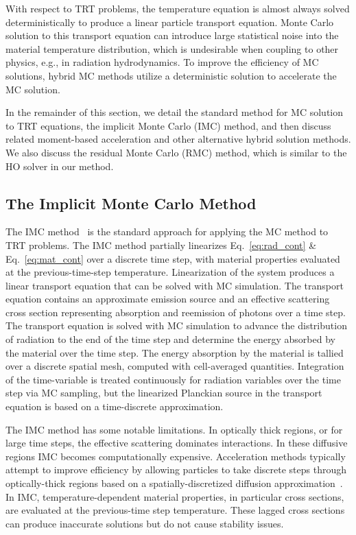 With respect to TRT problems, the temperature equation is almost always solved
deterministically to produce a linear particle transport equation. Monte Carlo solution to
this transport equation can introduce large statistical
noise into the material temperature distribution, which is undesirable when coupling to
other physics, e.g., in radiation hydrodynamics.  To improve the efficiency of MC solutions, hybrid MC methods utilize a
deterministic solution to accelerate the MC solution.  

In the remainder of this section, we detail the standard method for MC solution to TRT
equations, the implicit Monte Carlo (IMC) method, and then discuss related moment-based acceleration and other
alternative hybrid solution methods.  We also discuss the residual Monte Carlo (RMC) method, which is
similar to the HO solver in our method.

\subsection{The Implicit Monte Carlo Method}
\label{sec:imc}

The IMC method~\cite{fnc,wollaber_review} is the standard approach for applying the MC
method to TRT problems.  The IMC method partially linearizes Eq.~\eqref{eq:rad_cont} \&
Eq.~\eqref{eq:mat_cont} over a discrete time step, with material properties evaluated at
the previous-time-step temperature.  Linearization of the system produces a linear
transport equation that can be solved with MC simulation.  The transport equation contains
an approximate emission source and an effective scattering cross section representing
absorption and reemission of photons over a time step.  The transport equation is solved
with MC simulation to advance the distribution of radiation to the end of the time step
and determine the energy absorbed by the material over the time step.  The energy
absorption by the material is tallied over a discrete spatial mesh, computed with
cell-averaged quantities.  Integration of the time-variable is treated continuously for
radiation variables over the time step via MC sampling, but the linearized Planckian
source in the transport equation is based on a time-discrete approximation. 

The IMC method has some notable limitations.  In optically thick regions, or for large time steps,
the effective scattering dominates interactions.  In these diffusive regions IMC becomes
computationally expensive. Acceleration methods typically attempt to improve efficiency by
allowing particles to take discrete steps through optically-thick regions based on a
spatially-discretized diffusion approximation~\cite{imd,ddmc}. 
In IMC, temperature-dependent material
properties, in particular cross sections, are evaluated at the previous-time step
temperature. These lagged cross sections can produce inaccurate solutions but do not cause
stability issues.  

